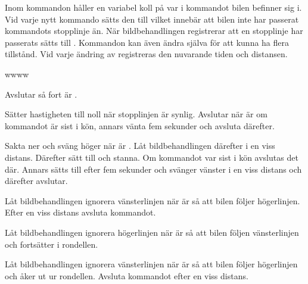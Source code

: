 \documentclass[tekniskrapport/tech.tex]{subfiles}
\begin{document}
Inom kommandon håller en variabel  koll på var i kommandot bilen
befinner sig i. Vid varje nytt kommando sätts den till 
vilket innebär att bilen inte har passerat kommandots stopplinje än. När
bildbehandlingen registrerar att en stopplinje har passerats sätts 
till . Kommandon kan även ändra  själva för att
kunna ha flera tillstånd. Vid varje ändring av  registreras den
nuvarande tiden och distansen.

\begin{labeling}{wwww}
    \item[\commIgnore] Avslutar så fort  är .
    \item[\commStop] Sätter hastigheten till noll när stopplinjen är synlig.
        Avslutar när  är  om kommandot är sist i
        kön, annars vänta fem sekunder och avsluta därefter.
    \item[\commPark] Sakta ner och sväng höger när  är
        . Låt bildbehandlingen därefter i en viss distans.
        Därefter sätt  till  och stanna. Om kommandot
        var sist i kön avslutas det där. Annars sätts  till
         efter fem sekunder och svänger vänster i en viss
        distans och därefter avslutar.
    \item[\commEnter] Låt bildbehandlingen ignorera vänsterlinjen när
         är  så att bilen följer högerlinjen. Efter
        en viss distans avsluta kommandot.
    \item[\commContinue] Låt bildbehandlingen ignorera högerlinjen när
         är  så att bilen följen vänsterlinjen och
        fortsätter i rondellen.
    \item[\commExit] Låt bildbehandlingen ignorera vänsterlinjen när 
        är  så att bilen följer högerlinjen och åker ut ur
        rondellen. Avsluta kommandot efter en viss distans.
\end{labeling}
\end{document}
